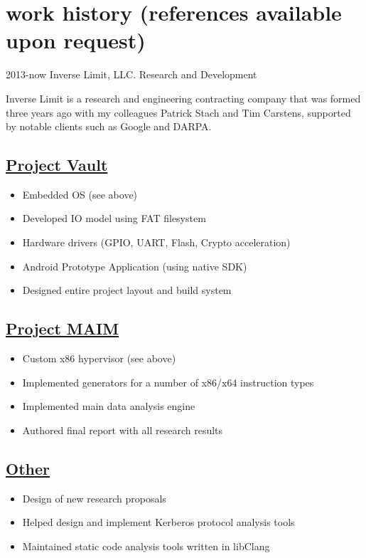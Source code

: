 \documentclass[]{friggeri-cv}
\newcommand{\heading}[1]{
  \vskip 0.05in
  \subsection{\uline{\small{#1}}}
  \vskip 0.05in
}
\begin{document}
\section{work history \hfill {\footnotesize{}(references available upon request)}}

\begin{entrylist}
  \entry
    {2013-now}
    {Inverse Limit, LLC.}
    {Research and Development}
    {

      Inverse Limit is a research and engineering contracting company
      that was formed three years ago with my colleagues
      Patrick Stach and Tim Carstens, supported by notable clients
      such as Google and DARPA. 

      \heading{Project Vault}
      
      \begin{itemize}
      \item{Embedded OS (see above)}
      \item{Developed IO model using FAT filesystem}
      \item{Hardware drivers (GPIO, UART, Flash, Crypto acceleration)}
      \item{Android Prototype Application (using native SDK)}
      \item{Designed entire project layout and build system}
      \end{itemize}

      \heading{Project MAIM}
      
      \begin{itemize}
      \item{Custom x86 hypervisor (see above)}
      \item{Implemented generators for a number of x86/x64 instruction types}
      \item{Implemented main data analysis engine}
      \item{Authored final report with all research results}
      \end{itemize}

      \heading{Other}
      
      \begin{itemize}
      \item{Design of new research proposals}
      \item{Helped design and implement Kerberos protocol analysis tools}
      \item{Maintained static code analysis tools written in libClang}
      \end{itemize}
      
}
\end{entrylist}
\end{document}
